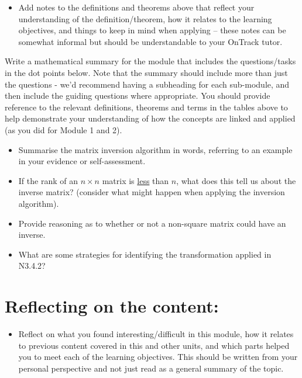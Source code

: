 \documentclass[
  12pt,
  a4paper,
]{article}
\begin{document}
\begin{itemize}
    \item Add notes to the definitions and theorems above that reflect your understanding of the definition/theorem, how it relates to the learning objectives, and things to keep in mind when applying – these notes can be somewhat informal but should be understandable to your OnTrack tutor. 
\end{itemize}
\noindent
Write a mathematical summary for the module that includes the questions/tasks in the dot points below.  Note that the summary should include more than just the questions - we’d recommend having a subheading for each sub-module, and then include the guiding questions where appropriate.  You should provide reference to the relevant definitions, theorems and terms in the tables above to help demonstrate your understanding of how the concepts are linked and applied (as you did for Module 1 and 2).
\begin{itemize}
    \item Summarise the matrix inversion algorithm in words, referring to an example in your evidence or self-assessment.
	\item If the rank of an $n \times n$ matrix is \underline{less} than $n$, what does this tell us about the inverse matrix? (consider what might happen when applying the inversion algorithm).
	\item Provide reasoning as to whether or not a non-square matrix could have an inverse.
    \item What are some strategies for identifying the transformation applied in N3.4.2?

\end{itemize}


\section*{Reflecting on the content:}
\begin{itemize}
    \item Reflect on what you found interesting/difficult in this module, how it relates to previous content covered in this and other units, and which parts helped you to meet each of the learning objectives. This should be written from your personal perspective and not just read as a general summary of the topic.
\end{itemize}
\end{document}
